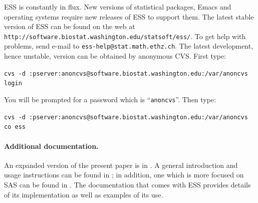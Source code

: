\documentclass{article}
\def\url#1{\stexttt{#1}} %
\newcommand{\stexttt}[1]{{\small\texttt{#1}}}
\begin{document}
ESS is constantly in flux.  New versions of statistical
packages, Emacs and operating systems require new releases of ESS to
support them.  The latest stable version of ESS can be found on the web at
\url{http://software.biostat.washington.edu/statsoft/ess/}.  To get help
with problems, send e-mail to \url{ess-help@stat.math.ethz.ch}.
The latest development, hence unstable, version can be obtained by
anonymous CVS.  First type:

\stexttt{cvs -d
  :pserver:anoncvs@software.biostat.washington.edu:/var/anoncvs login}
  
You will be prompted for a password which is ``\stexttt{anoncvs}''.
Then type:

\stexttt{cvs -d
  :pserver:anoncvs@software.biostat.washington.edu:/var/anoncvs co
  ess}

\paragraph{Additional documentation.} 

An expanded version of the present paper is in \citep{RMHHS:2001}.  A
general introduction and usage instructions can be found in
\citep{heiberger:dsc:2001}; in addition, one which is more focused on
SAS can be found in \citep{heiberger:philasugi:2001}.  The
documentation that comes with ESS provides details of its
implementation as well as examples of its use.
\end{document}
